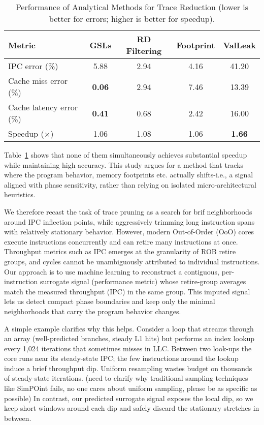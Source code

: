 \documentclass[conference]{IEEEtran}
\begin{document}
\begin{table}[htbp!]
\caption{Performance of Analytical Methods for Trace Reduction (lower is better for errors; higher is better for speedup).}
\label{tab:comparison_methods}
\centering
\setlength{\tabcolsep}{4pt}
\begin{adjustbox}{max width=1.09\columnwidth}
\begin{tabular}{l|cccc}
\toprule
Metric & GSLs & RD Filtering & Footprint & ValLeak \\
\midrule
IPC error (\%)             & 5.88 & {2.94} & 4.16 & 41.20 \\
Cache miss error (\%)      & \textbf{0.06} & 2.94 & 7.46 & 13.39 \\
Cache latency error (\%)   & \textbf{0.41} & 0.68 & 2.42 & 16.00 \\
Speedup ($\times$)         & 1.06 & 1.08 & 1.06 & \textbf{1.66} \\
\bottomrule
\end{tabular}
\end{adjustbox}
\end{table}


Table~\ref{tab:comparison_methods} shows that none of them simultaneously achieves substantial speedup while maintaining high accuracy. This study argues for a method that tracks where the program behavior, memory footprints etc. actually shifts-i.e., a signal aligned with phase sensitivity, rather than relying on isolated micro-architectural heuristics.


We therefore recast the task of trace pruning as a search for brif neighborhoods around IPC inflection points, while aggressively trimming long instruction spans with relatively stationary behavior. However, modern Out-of-Order (OoO) cores execute instructions concurrently and can retire many instructions at once. Throughput metrics such as IPC emerges at the granularity of ROB retire groups, and cycles cannot be unambiguously attributed to individual instructions. Our approach is to use machine learning to reconstruct a contiguous, per-instruction surrogate signal (performance metric) whose retire-group averages match the measured throughput (IPC) in the same group. This imputed signal lets us detect compact phase boundaries and keep only the minimal neighborhoods that carry the program behavior changes. 

A simple example clarifies why this helps. Consider a loop that streams through an array (well-predicted branches, steady L1 hits) but performs an index lookup every 1,024 iterations that sometimes misses in LLC. Between two look-ups the core runs near its steady-state IPC; the few instructions around the lookup induce a brief throughput dip. Uniform resampling wastes budget on thousands of steady-state iterations. (need to clarify why traditional sampling techniques like SimPOint fails, no one cares about uniform sampling, please be as specific as possible) In contrast, our predicted surrogate signal exposes the local dip, so we keep short windows around each dip and safely discard the stationary stretches in between.
\end{document}

